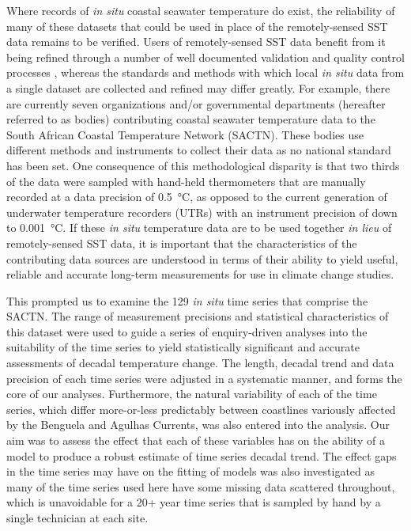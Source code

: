 \documentclass[]{ametsoc}
\begin{document}
Where records of \emph{in situ} coastal seawater temperature do exist, the reliability of many of these datasets that could be used in place of the remotely-sensed SST data remains to be verified. Users of remotely-sensed SST data benefit from it being refined through a number of well documented validation and quality control processes \citep[\emph{e.g.}][]{Reynolds1994, Brown1999, Martin2012}, whereas the standards and methods with which local \emph{in situ} data from a single dataset are collected and refined may differ greatly. For example, there are currently seven organizations and/or governmental departments (hereafter referred to as bodies) contributing coastal seawater temperature data to the South African Coastal Temperature Network (SACTN). These bodies use different methods and instruments to collect their data as no national standard has been set. One consequence of this methodological disparity is that two thirds of the data were sampled with hand-held thermometers that are manually recorded at a data precision of \SI{0.5}{\degreeCelsius}, as opposed to the current generation of underwater temperature recorders (UTRs) with an instrument precision of down to \SI{0.001}{\degreeCelsius}. If these \emph{in situ} temperature data are to be used together \emph{in lieu} of remotely-sensed SST data, it is important that the characteristics of the contributing data sources are understood in terms of their ability to yield useful, reliable and accurate long-term measurements for use in climate change studies.

This prompted us to examine the 129 \emph{in situ} time series that comprise the SACTN. The range of measurement precisions and statistical characteristics of this dataset were used to guide a series of enquiry-driven analyses into the suitability of the time series to yield statistically significant and accurate assessments of decadal temperature change. The length, decadal trend and data precision of each time series were adjusted in a systematic manner, and forms the core of our analyses. Furthermore, the natural variability of each of the time series, which differ more-or-less predictably between coastlines variously affected by the Benguela and Agulhas Currents, was also entered into the analysis. Our aim was to assess the effect that each of these variables has on the ability of a model to produce a robust estimate of time series decadal trend. The effect gaps in the time series may have on the fitting of models was also investigated as many of the time series used here have some missing data scattered throughout, which is unavoidable for a 20+ year time series that is sampled by hand by a single technician at each site.
\end{document}
